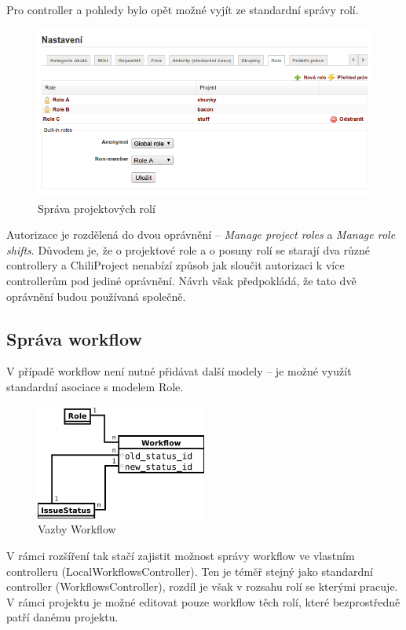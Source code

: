 \documentclass[thesis=B,czech]{FITthesis}[2012/05/02]
\begin{document}
Pro controller a pohledy bylo opět možné vyjít ze standardní správy
rolí.

\begin{figure}[tbp]
\centering
\includegraphics[width=1\textwidth]{role-gui1.png}
\caption{Správa projektových rolí}
\end{figure}

Autorizace je rozdělená do dvou oprávnění -- \emph{Manage project roles} a
\emph{Manage role shifts}. Důvodem je, že o projektové role a o posuny rolí
se starají dva různé controllery a ChiliProject nenabízí způsob jak
sloučit autorizaci k více controllerům pod jediné oprávnění. Návrh však
předpokládá, že tato dvě oprávnění budou používaná společně.

\subsection{Správa workflow}

V případě \gls{workflow} není nutné přidávat další modely -- je možné
využít standardní asociace s modelem Role.

\begin{figure}[htbp]
\centering
\includegraphics[width=0.5\textwidth]{role-er3.pdf}
\caption{Vazby Workflow}
\label{fig:Workflow}
\end{figure}

V rámci rozšíření tak stačí zajistit možnost správy workflow ve vlastním
controlleru (LocalWorkflowsController). Ten je téměř stejný jako
standardní controller (WorkflowsController), rozdíl je však v rozsahu
rolí se kterými pracuje. V rámci projektu je možné editovat pouze
workflow těch rolí, které bezprostředně patří danému projektu.
\end{document}
